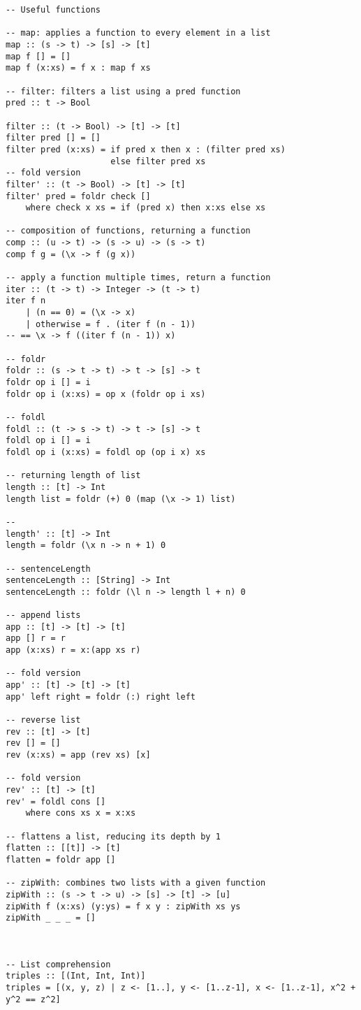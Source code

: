 \documentclass{article}
\begin{document}
\begin{verbatim}
-- Useful functions

-- map: applies a function to every element in a list
map :: (s -> t) -> [s] -> [t]
map f [] = []
map f (x:xs) = f x : map f xs

-- filter: filters a list using a pred function
pred :: t -> Bool

filter :: (t -> Bool) -> [t] -> [t]
filter pred [] = []
filter pred (x:xs) = if pred x then x : (filter pred xs)
                     else filter pred xs
-- fold version
filter' :: (t -> Bool) -> [t] -> [t]
filter' pred = foldr check []
	where check x xs = if (pred x) then x:xs else xs                     

-- composition of functions, returning a function
comp :: (u -> t) -> (s -> u) -> (s -> t)
comp f g = (\x -> f (g x))

-- apply a function multiple times, return a function
iter :: (t -> t) -> Integer -> (t -> t)
iter f n
	| (n == 0) = (\x -> x)
	| otherwise = f . (iter f (n - 1))
-- == \x -> f ((iter f (n - 1)) x)

-- foldr 
foldr :: (s -> t -> t) -> t -> [s] -> t
foldr op i [] = i
foldr op i (x:xs) = op x (foldr op i xs)

-- foldl
foldl :: (t -> s -> t) -> t -> [s] -> t
foldl op i [] = i
foldl op i (x:xs) = foldl op (op i x) xs

-- returning length of list
length :: [t] -> Int
length list = foldr (+) 0 (map (\x -> 1) list)

-- 
length' :: [t] -> Int
length = foldr (\x n -> n + 1) 0

-- sentenceLength
sentenceLength :: [String] -> Int
sentenceLength :: foldr (\l n -> length l + n) 0

-- append lists
app :: [t] -> [t] -> [t]
app [] r = r
app (x:xs) r = x:(app xs r)

-- fold version
app' :: [t] -> [t] -> [t]
app' left right = foldr (:) right left

-- reverse list
rev :: [t] -> [t]
rev [] = []
rev (x:xs) = app (rev xs) [x]

-- fold version
rev' :: [t] -> [t]
rev' = foldl cons []
	where cons xs x = x:xs

-- flattens a list, reducing its depth by 1
flatten :: [[t]] -> [t]
flatten = foldr app []

-- zipWith: combines two lists with a given function
zipWith :: (s -> t -> u) -> [s] -> [t] -> [u]
zipWith f (x:xs) (y:ys) = f x y : zipWith xs ys
zipWith _ _ _ = []



-- List comprehension
triples :: [(Int, Int, Int)]
triples = [(x, y, z) | z <- [1..], y <- [1..z-1], x <- [1..z-1], x^2 + y^2 == z^2]



\end{verbatim}
\end{document}
